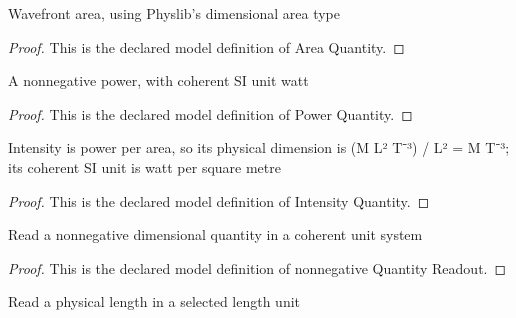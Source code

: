 \begin{definition}
  \label{def:physics:phyx-mini-0326:phyxminiproblems-problemphyxmini0326-areaquantity}
  Wavefront area, using Physlib's dimensional area type
\end{definition}
\begin{proof}
  This is the declared model definition of Area Quantity.
\end{proof}
\begin{definition}
  \label{def:physics:phyx-mini-0326:phyxminiproblems-problemphyxmini0326-powerquantity}
  A nonnegative power, with coherent SI unit watt
\end{definition}
\begin{proof}
  This is the declared model definition of Power Quantity.
\end{proof}
\begin{definition}
  \label{def:physics:phyx-mini-0326:phyxminiproblems-problemphyxmini0326-intensityquantity}
  Intensity is power per area, so its physical dimension is (M L² T⁻³) / L² = M T⁻³; its coherent SI unit is watt per square metre
\end{definition}
\begin{proof}
  This is the declared model definition of Intensity Quantity.
\end{proof}
\begin{definition}
  \label{def:physics:phyx-mini-0326:phyxminiproblems-problemphyxmini0326-nonnegativequantityreadout}
  Read a nonnegative dimensional quantity in a coherent unit system
\end{definition}
\begin{proof}
  This is the declared model definition of nonnegative Quantity Readout.
\end{proof}
\begin{definition}
  \label{def:physics:phyx-mini-0326:phyxminiproblems-problemphyxmini0326-lengthreadout}
  Read a physical length in a selected length unit
\end{definition}
